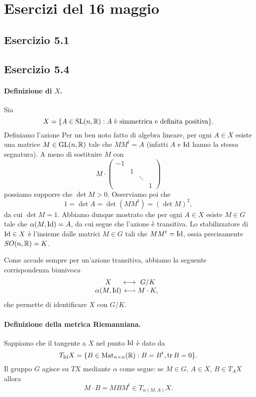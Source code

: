 \section*{Esercizi del 16 maggio}
\subsection*{Esercizio 5.1}


\subsection*{Esercizio 5.4}
\paragraph*{Definizione di $X$.} Sia
\[
X=\{A\in\operatorname{SL}(n,\mathbb{R}):\text{$A$ è simmetrica e definita positiva}\}.
\]
Definiamo l'azione
Per un ben noto fatto di algebra lineare, per ogni $A\in X$ esiste una matrice $M\in\operatorname{GL}(n,\mathbb{R})$ tale che $MM^t=A$ (infatti $A$ e $\operatorname{Id}$ hanno la stessa segnatura). A meno di sostituire $M$ con
\[
M\cdot\begin{pmatrix}-1&&&\\&1&&\\&&\ddots&\\&&&1\end{pmatrix}
\]
possiamo supporre che $\det M>0$. Osserviamo poi che
\[
1=\det A=\det(MM^t)=(\det M)^2,
\]
da cui $\det M=1$. Abbiamo dunque mostrato che per ogni $A\in X$ esiste $M\in G$ tale che $\alpha(M,\operatorname{Id})=A$, da cui segue che l'azione è transitiva. Lo stabilizzatore di $\operatorname{Id}\in X$ è l'insieme dalle matrici $M\in G$ tali che $MM^t=\operatorname{Id}$, ossia precisamente $SO(n,\mathbb{R})=K$.

Come accade sempre per un'azione transitiva, abbiamo la seguente corrispondenza biunivoca
\begin{equation*}
\begin{array}{@{}c@{{}\mathrel{}}c@{{}\mathrel{}}c}
X&\longleftrightarrow&G/K\\
\alpha(M,\Id)&\longmapsfrom& M\cdot K,
\end{array}
\end{equation*}
che permette di identificare $X$ con $G/K$.

\paragraph*{Definizione della metrica Riemanniana.} Sappiamo che il tangente a $X$ nel punto $\operatorname{Id}$ è dato da
\[
T_{\operatorname{Id}}X=\{B\in\operatorname{Mat}_{n\times n}(\mathbb{R}):B=B^t,\operatorname{tr} B=0\}.
\]
Il gruppo $G$ agisce su $TX$ mediante $\alpha$ come segue: se $M\in G$, $A\in X$, $B\in T_AX$ allora
\[
M\cdot B=MBM^t\in T_{\alpha(M,A)}X.
\]

